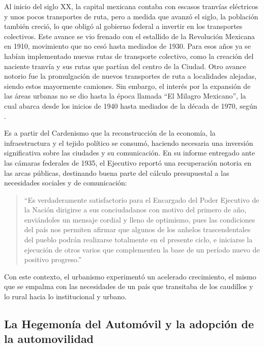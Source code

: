 
Al inicio del siglo XX, la capital mexicana contaba con escasos tranvías
eléctricos y unos pocos transportes de ruta, pero a medida que avanzó el siglo,
la población también creció, lo que obligó al gobierno federal a invertir en los
transportes colectivos. Este avance se vio frenado con el estallido de la
Revolución Mexicana en 1910, movimiento que no cesó hasta mediados de 1930. Para
esos años ya se habían implementado nuevas rutas de transporte colectivo, como
la creación del naciente tranvía y sus rutas que partían del centro de la
Ciudad. Otro avance notorio fue la promulgación de nuevos transportes de ruta a
localidades alejadas, siendo estos mayormente camiones. Sin embargo, el interés
por la expansión de las áreas urbanas no se dio hasta la época llamada ``El
Milagro Mexicano'', la cual abarca desde los inicios de 1940 hasta mediados de
la década de 1970, según \citet{molina2018}.

Es a partir del Cardenismo que la reconstrucción de la economía, la
infraestructura y el tejido político se consumó, haciendo necesaria una
inversión significativa sobre las ciudades y su comunicación. En su informe
entregado ante las cámaras federales de 1935, el Ejecutivo reportó una
recuperación notoria en las arcas públicas, destinando buena parte del cálculo
presupuestal a las necesidades sociales y de comunicación:

\begin{quote}
``Es verdaderamente satisfactorio para el Encargado del Poder Ejecutivo de la
Nación dirigirse a sus conciudadanos con motivo del primero de año, enviándoles
un mensaje cordial y lleno de optimismo, pues las condiciones del país nos
permiten afirmar que algunos de los anhelos trascendentales del pueblo podrán
realizarse totalmente en el presente ciclo, e iniciarse la ejecución de otros
varios que complementen la base de un período nuevo de positivo progreso.''
\citep[pp.~2--4]{biblioteca1935}
\end{quote}

Con este contexto, el urbanismo experimentó un acelerado crecimiento, el mismo
que se empalma con las necesidades de un país que transitaba de los caudillos y
lo rural hacia lo institucional y urbano.

\subsection{La Hegemonía del Automóvil y la adopción de la automovilidad}
\label{sec:hegemonia-automovil}

